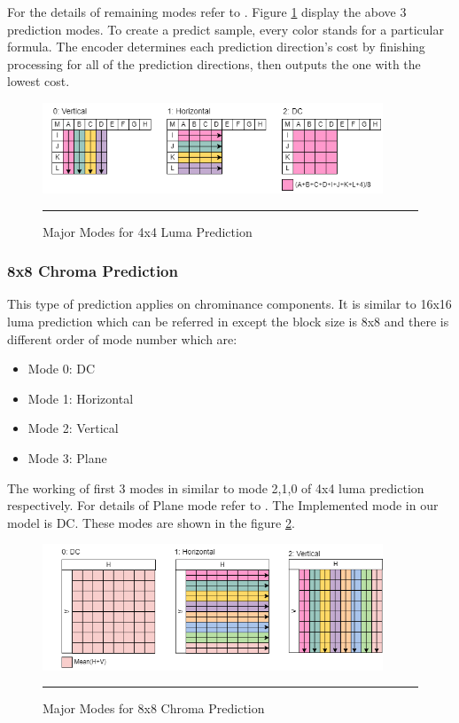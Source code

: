 For the details of remaining modes refer to \cite{richardson2010h264}. Figure \ref{fig:3modes} display the above 3 prediction modes. To create a predict sample, every color stands for a particular formula. The encoder determines each prediction direction's cost by finishing processing for all of the prediction directions, then outputs the one with the lowest cost.

\begin{figure}[htbp]
	\centering
	\includegraphics[width = 4in]{./Figures/3modes.png}
	\rule{35em}{0.5pt}
	\caption{Major Modes for 4x4 Luma Prediction}
	\label{fig:3modes}
\end{figure}

\subsubsection{8x8 Chroma Prediction}
This type of prediction applies on chrominance components. It is similar to 16x16 luma prediction which can be referred in \cite{richardson2010h264} except the block size is 8x8 and there is different order of mode number which are:

\begin{itemize}
	\item Mode 0: DC
	\item Mode 1: Horizontal
	\item Mode 2: Vertical
	\item Mode 3: Plane
\end{itemize}

The working of first 3 modes in similar to mode 2,1,0 of 4x4 luma prediction respectively. For details of Plane mode refer to \cite{richardson2010h264}. The Implemented mode in our model is DC. These modes are shown in the figure \ref{fig:8x8modes}.

\begin{figure}[htbp]
	\centering
	\includegraphics[width = 4in]{./Figures/8x8modes.png}
	\rule{35em}{0.5pt}
	\caption{Major Modes for 8x8 Chroma Prediction}
	\label{fig:8x8modes}
\end{figure}

